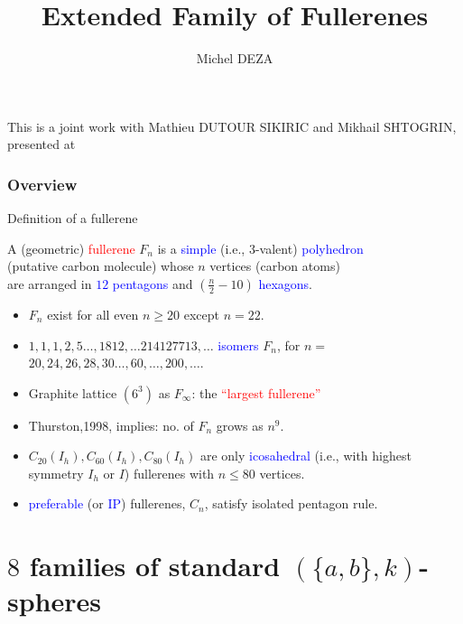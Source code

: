 \documentclass{beamer}
\title[Extended famil]{Extended Family  of Fullerenes}
\author{Michel DEZA}
\institute{Ecole Normale Superieure, Paris}
\date{}
\begin{document}
\begin{frame}
\titlepage
This is a joint work with Mathieu DUTOUR SIKIRIC and Mikhail SHTOGRIN, 
presented at 
\end{frame}

\begin{frame}
\frametitle{Overview} \tableofcontents
\end{frame}


\begin{frame}{Definition of a fullerene}


A (geometric) \textcolor{red}{fullerene} $F_n$ is a 
\textcolor{blue}{simple}
(i.e., $3$-valent)
 \textcolor{blue}{polyhedron}\\
(putative carbon molecule) whose $n$ vertices (carbon atoms) \\are
arranged in
\textcolor{blue}{$12$ pentagons} and $(\frac{n}{2}-10)$ 
\textcolor{blue}{hexagons}.

\begin{itemize}
\item $F_n$ exist for all even $n\geq 20$ except $n=22$.
\item $1,1,1,2,5 \dots, 1812, \dots 214127713, \dots$
\textcolor{blue}{isomers} $F_n$, for
$n=$ \\$20, 24, 26,28,30
\dots, 60, \dots , 200, \dots $.

\item Graphite lattice $(6^3)$ as $F_{\infty}$:
the \textcolor{red}{``largest fullerene''}



\item Thurston,1998, implies: no. of $F_n$ grows as $n^9$.

\item $C_{20}(I_h),C_{60}(I_h),C_{80}(I_h)$ are only 
\textcolor{blue}{icosahedral}
(i.e., with highest \\symmetry $I_h$ or $I$) fullerenes with $n \le 80$
vertices.
\item \textcolor{blue}{preferable} (or \textcolor{blue}{IP}) fullerenes, 
$C_n$, satisfy 
isolated
pentagon rule.
\end{itemize}
\end{frame}






\section[General]{$8$  families of standard $(\{a,b\},k)$-spheres}
\end{document}
